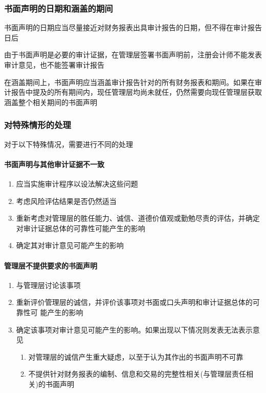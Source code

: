 \documentclass[UTF8,12pt]{ctexart}
\numberwithin{equation}{section} %
\numberwithin{figure}{section}
\numberwithin{table}{section}
\begin{document}
	\subsubsection{书面声明的日期和涵盖的期间}
	书面声明的日期应当尽量接近对财务报表出具审计报告的日期，但不得在审计报告日后
	
	由于书面声明是必要的审计证据，在管理层签署书面声明前，注册会计师不能发表审计意见，也不能签署审计报告
	
	在涵盖期间上，书面声明应当涵盖审计报告针对的所有财务报表和期间。如果在审计报告中提及的所有期间内，现任管理层均尚未就任，仍然需要向现任管理层获取涵盖整个相关期间的书面声明
	
	\subsubsection{对特殊情形的处理}
	对于以下特殊情况，需要进行不同的处理
	\paragraph{书面声明与其他审计证据不一致}
	\begin{enumerate}
		\item 应当实施审计程序以设法解决这些问题
		
		\item 考虑风险评估结果是否仍然适当
		
		\item 重新考虑对管理层的胜任能力、诚信、道德价值观或勤勉尽责的评估，并确定对审计证据总体的可靠性可能产生的影响
		
		\item 确定其对审计意见可能产生的影响
	\end{enumerate}
	
	
	\paragraph{管理层不提供要求的书面声明}
	\begin{enumerate}
		\item 与管理层讨论该事项
		
		\item 重新评价管理层的诚信，并评价该事项对书面或口头声明和审计证据总体的可靠性可 能产生的影响
		
		\item 确定该事项对审计意见可能产生的影响。如果出现以下情况则发表无法表示意见
		\begin{enumerate}
			\item 对管理层的诚信产生重大疑虑，以至于认为其作出的书面声明不可靠
			
			\item 不提供针对财务报表的编制、信息和交易的完整性相关(与管理层责任相关)的书面声明
		\end{enumerate}
	\end{enumerate}
	
\end{document}
